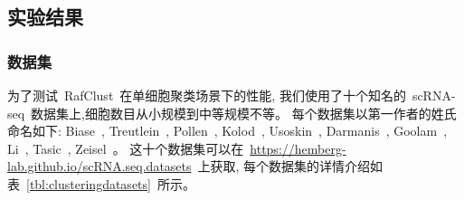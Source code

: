 \subsection{实验结果}

\subsubsection{数据集}
\label{subsec:datasets} 

为了测试~RafClust~在单细胞聚类场景下的性能,
我们使用了十个知名的~scRNA-seq~数据集上,细胞数目从小规模到中等规模不等。
每个数据集以第一作者的姓氏命名如下: 
Biase~\cite{biase2014cell},
Treutlein~\cite{treutlein2014reconstructing}, 
Pollen~\cite{pollen2014low}, 
Kolod~\cite{kolodziejczyk2015single}, 
Usoskin~\cite{usoskin2015unbiased}, 
Darmanis~\cite{darmanis2015survey}, 
Goolam~\cite{goolam2016heterogeneity}, 
Li~\cite{li2017reference},
Tasic~\cite{tasic2016adult}, 
Zeisel~\cite{zeisel2015cell}。
这十个数据集可以在~\url{https://hemberg-lab.github.io/scRNA.seq.datasets}~上获取, 
每个数据集的详情介绍如表~\ref{tbl:clusteringdatasets}~所示。

